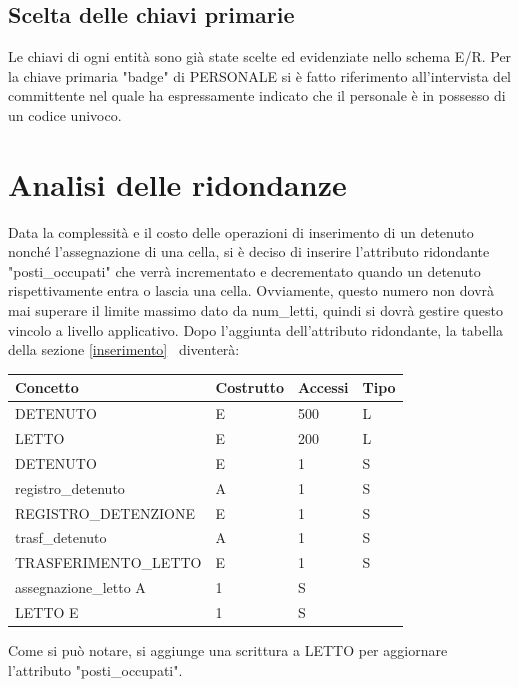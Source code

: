 \documentclass[a4paper,12pt]{report}
\begin{document}
\subsection{Scelta delle chiavi primarie}
Le chiavi di ogni entità sono già state scelte ed evidenziate nello schema E/R.
%
Per la chiave primaria "badge" di PERSONALE si è fatto riferimento all'intervista del committente nel quale ha espressamente indicato che il personale è in possesso di un codice univoco.
\section{Analisi delle ridondanze}
Data la complessità e il costo delle operazioni di inserimento di un detenuto nonché l'assegnazione di una cella, si è deciso di inserire l'attributo ridondante "posti\_occupati" che verrà incrementato e decrementato quando un detenuto rispettivamente entra o lascia una cella.
%
Ovviamente, questo numero non dovrà mai superare il limite massimo dato da num\_letti, quindi si dovrà gestire questo vincolo a livello applicativo.
%
Dopo l'aggiunta dell'attributo ridondante, la tabella della sezione \ref{inserimento}~ diventerà: 
\begin{table}[H]
\begin{tabular}{p{6cm} p{2cm} p{1cm} p{1cm}}
\hline
Concetto & Costrutto & Accessi & Tipo \\ \hline
DETENUTO & E & 500 & L \\
LETTO & E & 200 & L \\
DETENUTO & E & 1 & S \\
registro\_detenuto & A & 1 & S \\
REGISTRO\_DETENZIONE & E & 1 & S \\
trasf\_detenuto & A & 1 & S \\
TRASFERIMENTO\_LETTO & E & 1 & S \\
assegnazione\_letto A & 1 & S \\
LETTO E & 1 & S \\
\end{tabular}
\end{table}
Come si può notare, si aggiunge una scrittura a LETTO per aggiornare l'attributo "posti\_occupati".
\end{document}
